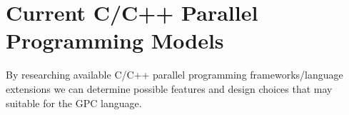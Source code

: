 \section{Current C/C++ Parallel Programming Models}

By researching available C/C++ parallel programming frameworks/language extensions 
we can determine possible features and design choices that may suitable for the GPC language.





